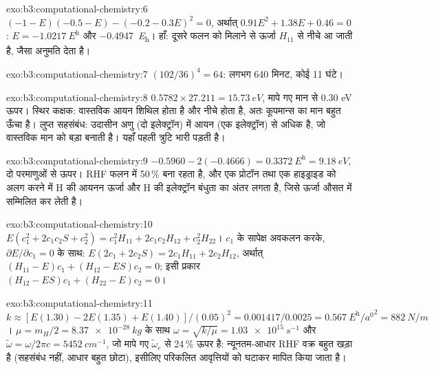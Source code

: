 \begin{solution}{exo:b3:computational-chemistry:6}
$(-1 - E)(-0.5 - E) - (-0.2 - 0.3E)^2 = 0$, अर्थात् $0.91E^2 + 1.38E + 0.46 = 0$:
$E = \qty{-1.0217}{\hartree}$ और \qty{-0.4947}{\hartree}। हाँ: दूसरे फलन को मिलाने से
ऊर्जा $H_{11}$ से नीचे आ जाती है, जैसा 
अनुमति देता है।
\end{solution}

\begin{solution}{exo:b3:computational-chemistry:7}
$(102/36)^4 = 64$: लगभग 640 मिनट, कोई 11 घंटे।
\end{solution}

\begin{solution}{exo:b3:computational-chemistry:8}
$0.5782 \times 27.211 = \qty{15.73}{eV}$, मापे गए मान से 0.30 eV ऊपर। स्थिर
कक्षक: वास्तविक आयन शिथिल होता है और नीचे होता है, अतः कूपमान्स का मान बहुत ऊँचा है।
लुप्त सहसंबंध: उदासीन अणु (दो इलेक्ट्रॉन) में आयन (एक इलेक्ट्रॉन) से अधिक  है, जो वास्तविक मान को बड़ा बनाती है।
यहाँ पहली त्रुटि भारी पड़ती है।
\end{solution}

\begin{solution}{exo:b3:computational-chemistry:9}
$-0.5960 - 2(-0.4666) = \qty{0.3372}{\hartree} = \qty{9.18}{eV}$, दो परमाणुओं से ऊपर।
RHF फलन में 50\,\%  बना रहता है, और एक प्रोटॉन तथा एक
हाइड्राइड को अलग करने में H की आयनन ऊर्जा और H की इलेक्ट्रॉन बंधुता का
अंतर लगता है, जिसे ऊर्जा औसत में सम्मिलित कर लेती है।
\end{solution}

\begin{solution}{exo:b3:computational-chemistry:10}
$E(c_1^2 + 2c_1c_2S + c_2^2) = c_1^2H_{11} + 2c_1c_2H_{12} + c_2^2H_{22}$।
$c_1$ के सापेक्ष अवकलन करके, $\partial E/\partial c_1 = 0$ के साथ:
$E(2c_1 + 2c_2S) = 2c_1H_{11} + 2c_2H_{12}$, अर्थात् $(H_{11} - E)c_1 + (H_{12} -
ES)c_2 = 0$; इसी प्रकार $(H_{12} - ES)c_1 + (H_{22} - E)c_2 = 0$।
\end{solution}

\begin{solution}{exo:b3:computational-chemistry:11}
$k \approx [E(1.30) - 2E(1.35) + E(1.40)]/(0.05)^2 = 0.001417/0.0025 =
\qty{0.567}{\hartree\per\bohr\squared} = \qty{882}{N/m}$। $\mu = m_H/2 =
\qty{8.37e-28}{kg}$ के साथ $\omega = \sqrt{k/\mu} = \qty{1.03e15}{s^{-1}}$ और
$\tilde\omega = \omega/2\pi c = \qty{5452}{cm^{-1}}$, जो मापे गए
$\tilde\omega_e$ से 24\,\% ऊपर है: न्यूनतम-आधार RHF वक्र बहुत खड़ा है (सहसंबंध नहीं, आधार
बहुत छोटा), इसीलिए परिकलित आवृत्तियों को घटाकर मापित किया जाता है।
\end{solution}

